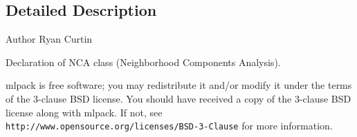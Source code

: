 \subsection{Detailed Description}
\begin{DoxyAuthor}{Author}
Ryan Curtin
\end{DoxyAuthor}
Declaration of N\+CA class (Neighborhood Components Analysis).

mlpack is free software; you may redistribute it and/or modify it under the terms of the 3-\/clause B\+SD license. You should have received a copy of the 3-\/clause B\+SD license along with mlpack. If not, see {\tt http\+://www.\+opensource.\+org/licenses/\+B\+S\+D-\/3-\/\+Clause} for more information. 